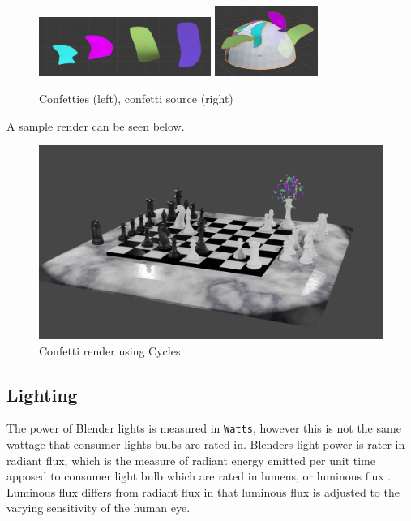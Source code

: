 \documentclass[11pt]{article}
\begin{document}
\begin{figure}[htbp]
\begin{center}
\includegraphics[width=0.5\textwidth]{Images/confetties.png}
\includegraphics[width=0.3\textwidth]{Images/confetti dome.png}
\end{center}
\caption{Confetties (left), confetti source (right)}
\end{figure}

A sample render can be seen below.
\begin{figure}[htbp]
\centering
\includegraphics[width=\textwidth]{Images/Confetti! cycles.png}
\caption{Confetti render using Cycles}
\end{figure}
\newpage
\subsection{Lighting}
\label{sec:orga10d1dc}
The power of Blender lights is measured in \texttt{Watts}, however this is not the same
wattage that consumer lights bulbs are rated in. Blenders light power is rater
in radiant flux, which is the measure of radiant energy emitted per unit time
apposed to consumer light bulb which are rated in lumens, or luminous flux
\cite{radiant-flux,luminous-flux}. Luminous flux differs from radiant flux in that
luminous flux is adjusted to the varying sensitivity of the human eye.
\cite{luminous-flux}
\end{document}

